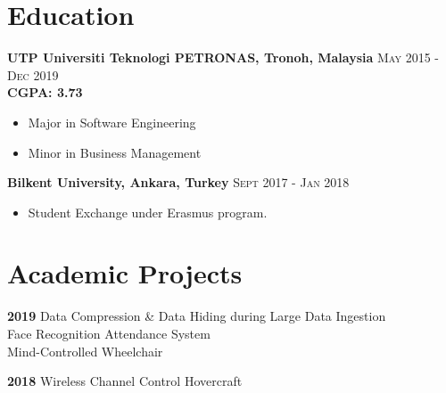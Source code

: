 \documentclass[English]{cv-style}
\begin{document}
\section{Education}
\vspace{-0.3cm}
\textbf{UTP Universiti Teknologi PETRONAS, Tronoh, Malaysia}
    \quad \quad \quad \quad \quad \quad \quad \quad \quad \quad
\textsc{May 2015 - Dec 2019} \\
    \quad \quad \quad \quad \quad \quad  
\textbf{CGPA: 3.73} \vspace{-0.15cm}
    \begin{itemize}[noitemsep]
        \item Major in Software Engineering
        \item Minor in Business Management
    \end{itemize}
\textbf{Bilkent University, Ankara, Turkey}
    \quad \quad \quad \quad \quad \quad \quad \quad \quad
    \quad \quad \quad \quad \quad \quad \quad \quad \quad
\textsc{ Sept 2017 - Jan 2018} \\
 \vspace{-0.15cm}
    \begin{itemize}[noitemsep]
        \item Student Exchange under Erasmus program.
    \end{itemize}
\section{Academic Projects}
\vspace{-0.2cm}
\textbf{2019}
    \vspace{0.1mm} {\quad \quad Data Compression \& Data Hiding during Large Data Ingestion} \\
    \vspace{0.1mm} {\quad \quad \quad \quad Face Recognition Attendance System} \\
    \vspace{0.1mm} {\quad \quad \quad \quad Mind-Controlled Wheelchair} 
    
\textbf{2018}
    \vspace{0.1mm} {\quad \quad Wireless Channel Control Hovercraft}    
 
\end{document}
